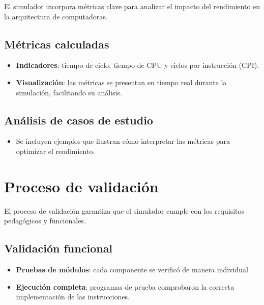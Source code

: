 \documentclass[12pt,oneside]{templates/unerthesis}
\providecommand{\tightlist}{%
  \setlength{\itemsep}{0pt}\setlength{\parskip}{0pt}}
\begin{document}
El simulador incorpora métricas clave para analizar el impacto del rendimiento en la arquitectura de computadoras.

\hypertarget{muxe9tricas-calculadas}{%
\subsection{Métricas calculadas}\label{muxe9tricas-calculadas}}

\begin{itemize}
\tightlist
\item
  \textbf{Indicadores}: tiempo de ciclo, tiempo de CPU y ciclos por instrucción (CPI).
\item
  \textbf{Visualización}: las métricas se presentan en tiempo real durante la simulación, facilitando su análisis.
\end{itemize}

\hypertarget{anuxe1lisis-de-casos-de-estudio}{%
\subsection{Análisis de casos de estudio}\label{anuxe1lisis-de-casos-de-estudio}}

\begin{itemize}
\tightlist
\item
  Se incluyen ejemplos que ilustran cómo interpretar las métricas para optimizar el rendimiento.
\end{itemize}

\hypertarget{proceso-de-validaciuxf3n}{%
\section{Proceso de validación}\label{proceso-de-validaciuxf3n}}

El proceso de validación garantiza que el simulador cumple con los requisitos pedagógicos y funcionales.

\hypertarget{validaciuxf3n-funcional}{%
\subsection{Validación funcional}\label{validaciuxf3n-funcional}}

\begin{itemize}
\tightlist
\item
  \textbf{Pruebas de módulos}: cada componente se verificó de manera individual.
\item
  \textbf{Ejecución completa}: programas de prueba comprobaron la correcta implementación de las instrucciones.
\end{itemize}
\end{document}
